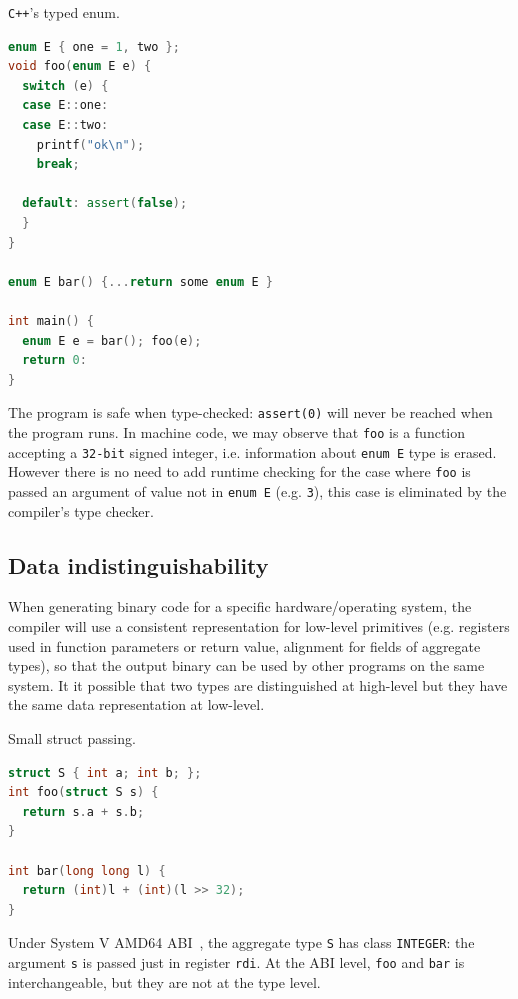\documentclass[a4paper]{llncs}
\begin{document}
\begin{example}\label{exa:typed_enum}
\texttt{C++}'s typed enum.

\begin{lstlisting}[frame=lines, language={C++}]
enum E { one = 1, two };
void foo(enum E e) {
  switch (e) {
  case E::one:
  case E::two:
    printf("ok\n");
    break;

  default: assert(false);
  }
}

enum E bar() {...return some enum E }

int main() {
  enum E e = bar(); foo(e);
  return 0:
}
\end{lstlisting}

The program is safe when type-checked: \texttt{assert(0)} will
never be reached when the program runs. In machine code, we may observe that
\texttt{foo} is a function accepting a \texttt{32-bit} signed integer, i.e. information about
\texttt{enum E} type is erased. However there is no need to add runtime
checking for the case where \texttt{foo} is passed an argument of value not in \texttt{enum E}
(e.g. \texttt{3}), this case is eliminated by the compiler's type checker.
\end{example}

\subsection{Data indistinguishability}
When generating binary code for a specific hardware/operating system, the compiler will
use a consistent representation for low-level primitives (e.g. registers used in
function parameters or return value, alignment for fields of aggregate types), so that
the output binary can be used by other programs on the same system. It it possible that
two types are distinguished at high-level but they have the same data representation
at low-level.

\begin{example}\label{exa:register_struct}
Small struct passing.

\begin{lstlisting}[frame=lines, language={C}]
struct S { int a; int b; };
int foo(struct S s) {
  return s.a + s.b;
}

int bar(long long l) {
  return (int)l + (int)(l >> 32);
}
\end{lstlisting}

Under System V AMD64 ABI~\cite{lu_system_nodate}, the aggregate type \texttt{S}
has class \texttt{INTEGER}: the argument \texttt{s} is passed just in register \texttt{rdi}.
At the ABI level, \texttt{foo} and \texttt{bar} is interchangeable, but they are not at
the type level.
\end{example}
\end{document}
